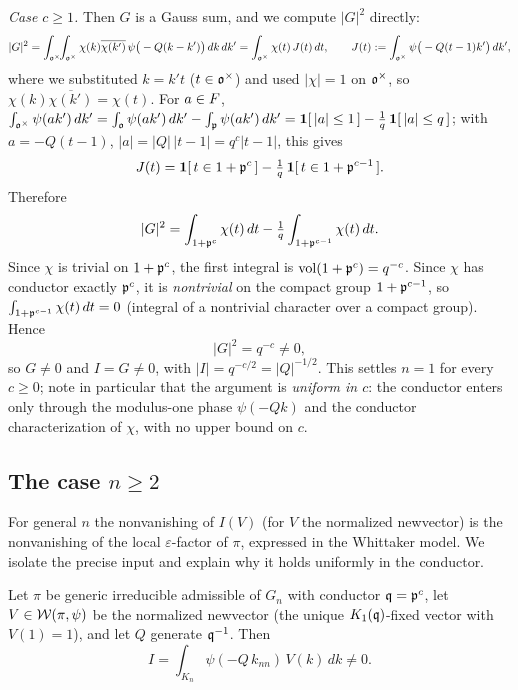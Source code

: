 \emph{Case $c\ge1$.} Then $G$ is a Gauss sum, and we compute $|G|^2$ directly:
\[
|G|^2=\int_{\mathfrak{o}^\times}\!\!\int_{\mathfrak{o}^\times}\chi(k)\overline{\chi(k')}\,
\psi\big(-Q(k-k')\big)\,dk\,dk'
=\int_{\mathfrak{o}^\times}\chi(t)\,J(t)\,dt,\qquad
J(t):=\int_{\mathfrak{o}^\times}\psi\big(-Q(t-1)k'\big)\,dk',
\]
where we substituted $k=k't$ \textup{(}$t\in\mathfrak{o}^\times$\textup{)} and used $|\chi|=1$ on
$\mathfrak{o}^\times$, so $\chi(k)\overline{\chi(k')}=\chi(t)$. For $a\in F$,
$\int_{\mathfrak{o}^\times}\psi(ak')\,dk'=\int_{\mathfrak{o}}\psi(ak')\,dk'-\int_{\mathfrak{p}}\psi(ak')\,dk'
=\mathbf 1[\,|a|\le1\,]-\tfrac1q\,\mathbf 1[\,|a|\le q\,]$; with $a=-Q(t-1)$, $|a|=|Q|\,|t-1|=q^{c}|t-1|$,
this gives
\[
J(t)=\mathbf 1[\,t\in1+\mathfrak{p}^{c}\,]-\tfrac1q\,\mathbf 1[\,t\in1+\mathfrak{p}^{c-1}\,].
\]
Therefore
\[
|G|^2=\int_{1+\mathfrak{p}^{c}}\chi(t)\,dt-\tfrac1q\int_{1+\mathfrak{p}^{c-1}}\chi(t)\,dt .
\]
Since $\chi$ is trivial on $1+\mathfrak{p}^{c}$, the first integral is
$\operatorname{vol}(1+\mathfrak{p}^{c})=q^{-c}$. Since $\chi$ has conductor exactly $\mathfrak{p}^{c}$, it is
\emph{nontrivial} on the compact group $1+\mathfrak{p}^{c-1}$, so $\int_{1+\mathfrak{p}^{c-1}}\chi(t)\,dt=0$
\textup{(}integral of a nontrivial character over a compact group\textup{)}. Hence
\[
|G|^2=q^{-c}\neq0,
\]
so $G\neq0$ and $I=G\neq0$, with $|I|=q^{-c/2}=|Q|^{-1/2}$. This settles $n=1$ for every $c\ge0$;
note in particular that the argument is \emph{uniform in $c$}: the conductor enters only through
the modulus-one phase $\psi(-Qk)$ and the conductor characterization of $\chi$, with no upper
bound on $c$.

\subsection*{The case $n\ge2$}
For general $n$ the nonvanishing of $I(V)$ \textup{(}for $V$ the normalized newvector\textup{)} is
the nonvanishing of the local $\varepsilon$-factor of $\pi$, expressed in the Whittaker model. We
isolate the precise input and explain why it holds uniformly in the conductor.

\begin{qtwotheorem}\label{thm:newvector}
Let $\pi$ be generic irreducible admissible of $G_n$ with conductor $\mathfrak{q}=\mathfrak{p}^{c}$, let
$V\in\mathcal{W}(\pi,\psi)$ be the normalized newvector \textup{(}the unique $K_1(\mathfrak{q})$-fixed
vector with $V(1)=1$\textup{)}, and let $Q$ generate $\mathfrak{q}^{-1}$. Then
\[
I=\int_{K_n}\psi(-Q\,k_{nn})\,V(k)\,dk\neq0 .
\]
\end{qtwotheorem}

